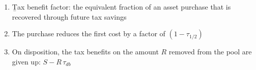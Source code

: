 \begin{enumerate}
    \item \b{Tax benefit factor}: the equivalent fraction of an asset purchase that is recovered through future tax savings
    \item The purchase reduces the first cost by a factor of $(1 - \tau_{1/2})$
    \item On disposition, the tax benefits on the amount $R$ removed from the pool are given up: $S - R\,\tau_{db}$
\end{enumerate}
